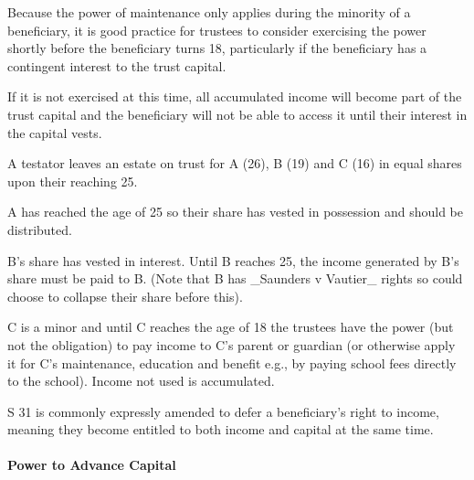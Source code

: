 \documentclass[
]{article}
\newenvironment{Shaded}{}{}
\newcommand{\NormalTok}[1]{#1}
\begin{document}
Because the power of maintenance only applies during the minority of a
beneficiary, it is good practice for trustees to consider exercising the
power shortly before the beneficiary turns 18, particularly if the
beneficiary has a contingent interest to the trust capital.

If it is not exercised at this time, all accumulated income will become
part of the trust capital and the beneficiary will not be able to access
it until their interest in the capital vests.

\begin{Shaded}
\begin{Highlighting}[]
\NormalTok{A testator leaves an estate on trust for A (26), B (19) and C (16) in equal shares upon their reaching 25.}

\NormalTok{A has reached the age of 25 so their share has vested in possession and should be distributed.}

\NormalTok{B’s share has vested in interest. Until B reaches 25, the income generated by B’s share must be paid to B. (Note that B has \_Saunders v Vautier\_ rights so could choose to collapse their share before this).}

\NormalTok{C is a minor and until C reaches the age of 18 the trustees have the power (but not the obligation) to pay income to C’s parent or guardian (or otherwise apply it for C’s maintenance, education and benefit e.g., by paying school fees directly to the school). Income not used is accumulated.}
\end{Highlighting}
\end{Shaded}

S 31 is commonly expressly amended to defer a beneficiary's right to
income, meaning they become entitled to both income and capital at the
same time.

\hypertarget{power-to-advance-capital}{%
\paragraph{Power to Advance Capital}\label{power-to-advance-capital}}
\end{document}
